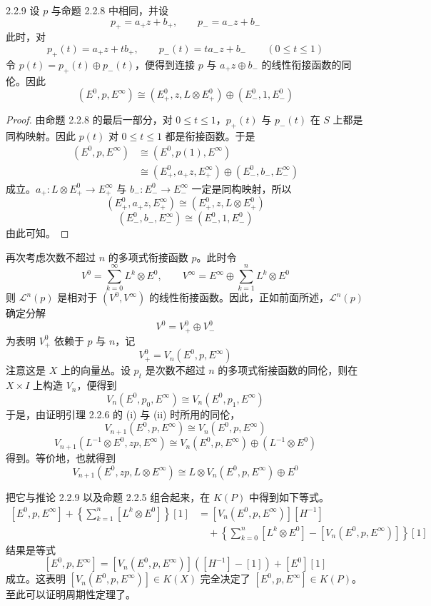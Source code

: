 \begin{corollary*}{2.2.9}
  设 $p$ 与命题 2.2.8 中相同，并设
  \[
  p_+=a_+z+b_+,\qquad p_-=a_-z+b_-
  \]
  此时，对
  \[
  p_+(t)=a_+z+tb_+,\qquad p_-(t)=ta_-z+b_-\qquad(0\le t\le1)
  \]
  令 $p(t)=p_+(t)\oplus p_-(t)$，便得到连接 $p$ 与 $a_+z\oplus b_-$ 的线性衔接函数的同伦。因此
  \[
  (E^0,p,E^\infty)\cong(E^0_+,z,L\otimes E^0_+)\oplus(E^0_-,1,E^0_-)
  \]
\end{corollary*}

\begin{proof}
  由命题 2.2.8 的最后一部分，对 $0\le t\le1$，$p_+(t)$ 与 $p_-(t)$ 在 $S$ 上都是同构映射。因此 $p(t)$ 对 $0\le t\le1$ 都是衔接函数。于是
  \[
  \begin{aligned}
  (E^0,p,E^\infty)&\cong(E^0,p(1),E^\infty)\\
  &\cong(E^0_+,a_+z,E^\infty_+)\oplus(E^0_-,b_-,E^\infty_-)
  \end{aligned}
  \]
  成立。$a_+\colon L\otimes E^0_+\to E^\infty_+$ 与 $b_-\colon E^0_-\to E^\infty_-$ 一定是同构映射，所以
  \[
  (E^0_+,a_+z,E^\infty_+)\cong(E^0_+,z,L\otimes E^0_+)
  \]
  \[
  (E^0_-,b_-,E^\infty_-)\cong(E^0_-,1,E^0_-)
  \]
  由此可知。
\end{proof}

再次考虑次数不超过 $n$ 的多项式衔接函数 $p$。此时令
\[
V^0=\sum_{k=0}^{\infty}L^k\otimes E^0,\qquad
V^\infty=E^\infty\oplus\sum_{k=1}^{n}L^k\otimes E^0
\]
则 $\mathcal{L}^n(p)$ 是相对于 $(V^0,V^\infty)$ 的线性衔接函数。因此，正如前面所述，$\mathcal{L}^n(p)$ 确定分解
\[
V^0=V^0_+\oplus V^0_-
\]
为表明 $V^0_+$ 依赖于 $p$ 与 $n$，记
\[
V^0_+=V_n(E^0,p,E^\infty)
\]
注意这是 $X$ 上的向量丛。设 $p_t$ 是次数不超过 $n$ 的多项式衔接函数的同伦，则在 $X\times I$ 上构造 $V_n$，便得到
\[
V_n(E^0,p_0,E^\infty)\cong V_n(E^0,p_1,E^\infty)
\]
于是，由证明引理 2.2.6 的 (i) 与 (ii) 时所用的同伦，
\[
V_{n+1}(E^0,p,E^\infty)\cong V_n(E^0,p,E^\infty)
\]
\[
V_{n+1}(L^{-1}\otimes E^0,zp,E^\infty)\cong V_n(E^0,p,E^\infty)\oplus(L^{-1}\otimes E^0)
\]
得到。等价地，也就得到
\[
V_{n+1}(E^0,zp,L\otimes E^\infty)\cong L\otimes V_n(E^0,p,E^\infty)\oplus E^0
\]

把它与推论 2.2.9 以及命题 2.2.5 组合起来，在 $K(P)$ 中得到如下等式。
\[
\begin{aligned}
[E^0,p,E^\infty]+\left\{\sum_{k=1}^{n}[L^k\otimes E^0]\right\}[1]
&=[V_n(E^0,p,E^\infty)][H^{-1}]\\
&\quad+\left\{\sum_{k=0}^{n}[L^k\otimes E^0]-[V_n(E^0,p,E^\infty)]\right\}[1]
\end{aligned}
\]
结果是等式
\[
[E^0,p,E^\infty]=[V_n(E^0,p,E^\infty)]([H^{-1}]-[1])+[E^0][1]
\]
成立。这表明 $[V_n(E^0,p,E^\infty)]\in K(X)$ 完全决定了 $[E^0,p,E^\infty]\in K(P)$。至此可以证明周期性定理了。

